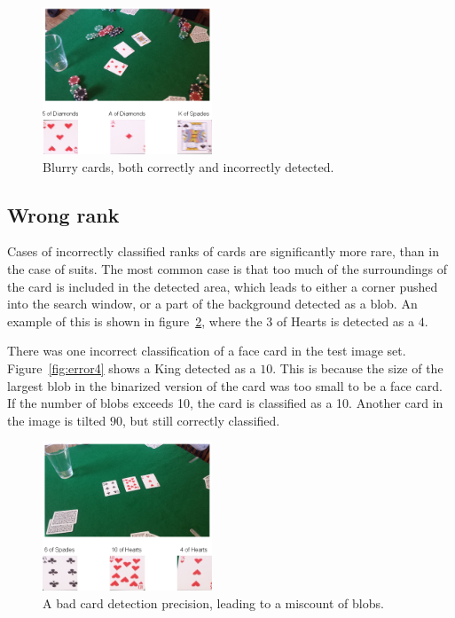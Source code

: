 \documentclass[journal,twoside]{IEEEtran}
\begin{document}
\begin{figure}[placement h]
\centering
\includegraphics[width=0.45\textwidth]{images/testResults/12.png}
\caption{Blurry cards, both correctly and incorrectly detected.}
\label{fig:error12}
\end{figure}


\subsection{Wrong rank}

Cases of incorrectly classified ranks of cards are significantly more rare, than in the case of suits. The most common case is that too much of the surroundings of the card is included in the detected area, which leads to either a corner pushed into the search window, or a part of the background detected as a blob. An example of this is shown in figure~\ref{fig:error20}, where the $3$ of Hearts is detected as a $4$.

There was one incorrect classification of a face card in the test image set. Figure~\ref{fig:error4} shows a King detected as a $10$. This is because the size of the largest blob in the binarized version of the card was too small to be a face card. If the number of blobs exceeds 10, the card is classified as a 10. Another card in the image is tilted $90$\degree, but still correctly classified.

\begin{figure}[placement h]
\centering
\includegraphics[width=0.45\textwidth]{images/testResults/20.png}
\caption{A bad card detection precision, leading to a miscount of blobs.}
\label{fig:error20}
\end{figure}
\end{document}

